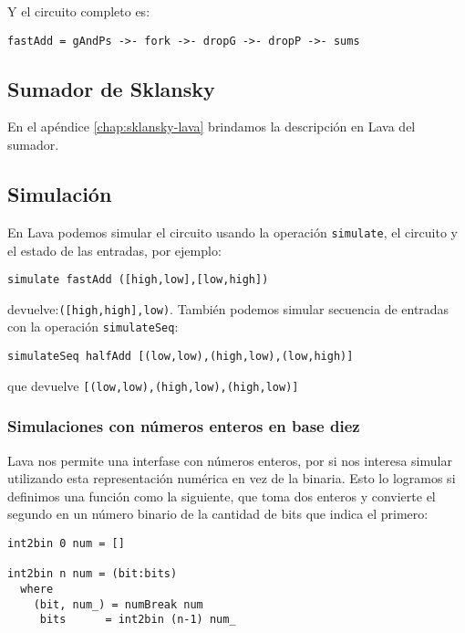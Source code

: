 \noindent Y el circuito completo es:
\begin{lstlisting}
fastAdd = gAndPs ->- fork ->- dropG ->- dropP ->- sums
\end{lstlisting}


\subsection{Sumador de Sklansky}
En el apéndice \ref{chap:sklansky-lava} brindamos la descripción en Lava del sumador.


\subsection{Simulación}
En Lava podemos simular el circuito usando la operación {\footnotesize\verb.simulate.}, el circuito y el estado de las entradas, por ejemplo:

{\footnotesize
\begin{verbatim}
simulate fastAdd ([high,low],[low,high])
\end{verbatim}
}

\noindent devuelve:{\footnotesize \verb|([high,high],low)|}. También podemos simular secuencia de entradas con la operación {\footnotesize\verb|simulateSeq|}:

{\footnotesize
\begin{verbatim} 
simulateSeq halfAdd [(low,low),(high,low),(low,high)]
\end{verbatim}
}

\noindent que devuelve {\footnotesize\verb|[(low,low),(high,low),(high,low)]|}

\subsubsection{Simulaciones con números enteros en base diez}
Lava nos permite una interfase con números enteros, por si nos interesa simular utilizando esta representación numérica en vez de la binaria. Esto lo logramos si definimos una función como la siguiente, que toma dos enteros y convierte el segundo en un número binario de la cantidad de bits que indica el primero:
\begin{lstlisting}
int2bin 0 num = []

int2bin n num = (bit:bits)
  where
    (bit, num_) = numBreak num
     bits      = int2bin (n-1) num_
\end{lstlisting}

